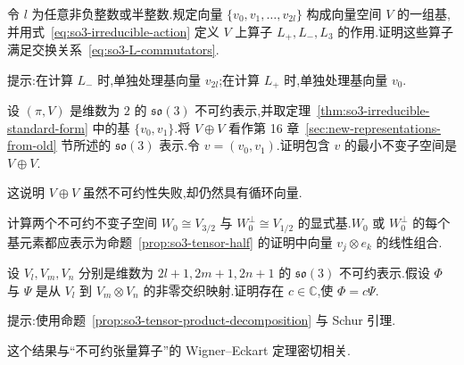 \begin{exercise}\label{ex:so3-representation-commutators}
令 $l$ 为任意非负整数或半整数.规定向量 $\{v_0,v_1,\ldots,v_{2l}\}$ 构成向量空间 $V$ 的一组基,并用式~\eqref{eq:so3-irreducible-action} 定义 $V$ 上算子 $L_+,L_-,L_3$ 的作用.证明这些算子满足交换关系~\eqref{eq:so3-L-commutators}.

提示:在计算 $L_-$ 时,单独处理基向量 $v_{2l}$;在计算 $L_+$ 时,单独处理基向量 $v_0$.
\end{exercise}

\begin{exercise}[直和表示中的循环向量]\label{ex:so3-cyclic-vector-direct-sum}
设 $(\pi,V)$ 是维数为 $2$ 的 $\mathfrak{so}(3)$ 不可约表示,并取定理~\ref{thm:so3-irreducible-standard-form} 中的基 $\{v_0,v_1\}$.将 $V\oplus V$ 看作第 16 章~\ref{sec:new-representations-from-old} 节所述的 $\mathfrak{so}(3)$ 表示.令 $v=(v_0,v_1)$.证明包含 $v$ 的最小不变子空间是 $V\oplus V$.

\begin{note}
这说明 $V\oplus V$ 虽然不可约性失败,却仍然具有循环向量.
\end{note}
\end{exercise}

\begin{exercise}[计算 $V_1\otimes V_{1/2}$ 的基]\label{ex:so3-tensor-half-bases}
计算两个不可约不变子空间 $W_0\cong V_{3/2}$ 与 $W_0^\perp\cong V_{1/2}$ 的显式基.$W_0$ 或 $W_0^\perp$ 的每个基元素都应表示为命题~\ref{prop:so3-tensor-half} 的证明中向量 $v_j\otimes e_k$ 的线性组合.
\end{exercise}

\begin{exercise}[交织映射的唯一性]\label{ex:so3-intertwiner-uniqueness}
设 $V_l,V_m,V_n$ 分别是维数为 $2l+1,2m+1,2n+1$ 的 $\mathfrak{so}(3)$ 不可约表示.假设 $\Phi$ 与 $\Psi$ 是从 $V_l$ 到 $V_m\otimes V_n$ 的非零交织映射.证明存在 $c\in\mathbb C$,使 $\Phi=c\Psi$.

提示:使用命题~\ref{prop:so3-tensor-product-decomposition} 与 Schur 引理.

\begin{note}
这个结果与“不可约张量算子”的 Wigner--Eckart 定理密切相关.
\end{note}
\end{exercise}
